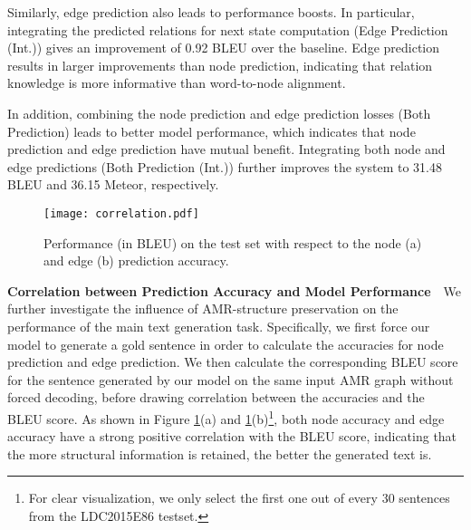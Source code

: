 \documentclass[11pt,a4paper]{article}
\begin{document}
Similarly, edge prediction also leads to performance boosts.
In particular, integrating the predicted relations for next state computation (Edge Prediction (Int.)) gives an improvement of 0.92 BLEU over the baseline.
Edge prediction results in larger improvements than node prediction, indicating that relation knowledge is more informative than word-to-node alignment.

In addition, combining the node prediction and edge prediction losses (Both Prediction) leads to better model performance, which indicates that node prediction and edge prediction have mutual benefit.
Integrating both node and edge predictions (Both Prediction (Int.)) further improves the system to 31.48 BLEU and 36.15 Meteor, respectively. 


\begin{figure}
	\centering
	\texttt{[image: correlation.pdf]}
	\caption{Performance (in BLEU) on the test set with respect to the node (a) and edge (b) prediction accuracy.}
	\label{fig:correlation}
\end{figure}

\begin{table}
	\small
	\caption{\label{tab:pearson} The pearson correlation coefficient  between the prediction accuracy and BLEU.}
\end{table}


\noindent \textbf{Correlation between Prediction Accuracy and Model Performance}~~We further investigate the influence of AMR-structure preservation on the performance of the main text generation task.
Specifically, we first force our model to generate a gold sentence in order to calculate the accuracies for node prediction and edge prediction.
We then calculate the corresponding BLEU score for the sentence generated by our model on the same input AMR graph without forced decoding, before drawing correlation between the accuracies and the BLEU score.
As shown in Figure \ref{fig:correlation}(a) and \ref{fig:correlation}(b)\footnote{For clear visualization, we only select the first one out of every 30 sentences from the LDC2015E86 testset.}, both node accuracy and edge accuracy have a strong positive correlation with the BLEU score, indicating that the more structural information is retained, the better the generated text is.
\end{document}
